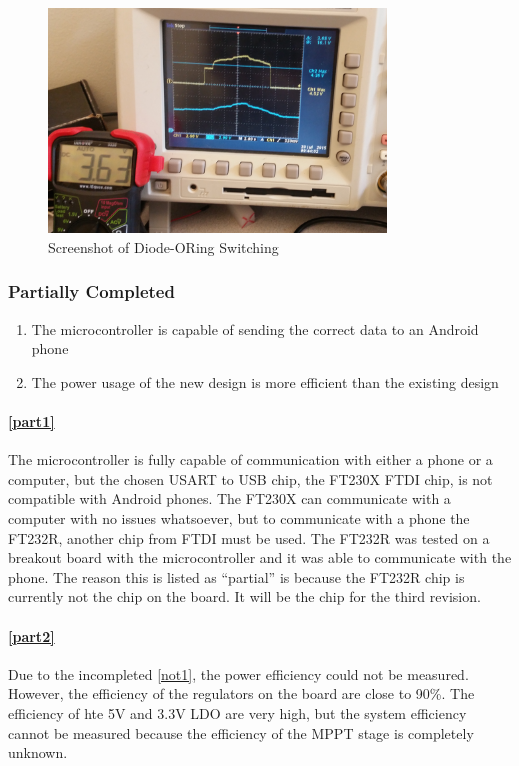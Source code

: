 \documentclass{article}
\numberwithin{figure}{section}
\numberwithin{equation}{section}
\begin{document}
{\begin{figure}[H]
	\centering
	\includegraphics[width=0.8\textwidth]{diode_or_screenshot}
	\caption{Screenshot of Diode-ORing Switching}
	\label{fig:diode_or_screenshot}
\end{figure}

\subsubsection{Partially Completed}\label{vv-part-completed}
\begin{enumerate}[align=left,leftmargin=*,labelindent=0em,label=\textbf{Item \thesubsubsection.\arabic*.},itemindent=0em]
    \item \label{part1} The microcontroller is capable of sending the correct data to an Android phone
    \item \label{part2} The power usage of the new design is more efficient than the existing design
\end{enumerate}

\paragraph{\ref{part1}}
The microcontroller is fully capable of communication with either a phone or a computer, but the chosen USART to USB chip, the FT230X FTDI chip, is not compatible with Android phones. The FT230X can communicate with a computer with no issues whatsoever, but to communicate with a phone the FT232R, another chip from FTDI must be used. The FT232R was tested on a breakout board with the microcontroller and it was able to communicate with the phone. The reason this is listed as ``partial'' is because the FT232R chip is currently not the chip on the board. It will be the chip for the third revision.

\paragraph{\ref{part2}}
Due to the incompleted \ref{not1}, the power efficiency could not be measured. However, the efficiency of the regulators on the board are close to 90\%. The efficiency of hte 5V and 3.3V LDO are very high, but the system efficiency cannot be measured because the efficiency of the MPPT stage is completely unknown.

}
\end{document}
